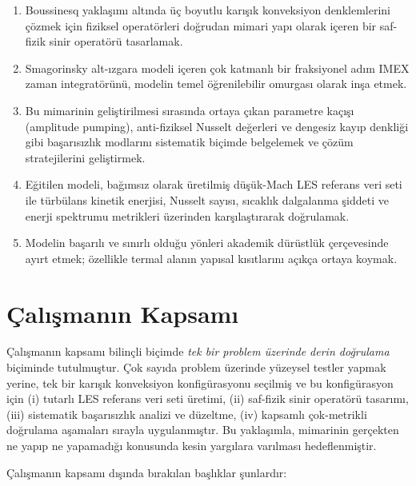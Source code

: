 \begin{enumerate}
  \item Boussinesq yaklaşımı altında üç boyutlu karışık konveksiyon denklemlerini çözmek için fiziksel operatörleri doğrudan mimari yapı olarak içeren bir saf-fizik sinir operatörü tasarlamak.
  \item Smagorinsky alt-ızgara modeli içeren çok katmanlı bir fraksiyonel adım IMEX zaman integratörünü, modelin temel öğrenilebilir omurgası olarak inşa etmek.
  \item Bu mimarinin geliştirilmesi sırasında ortaya çıkan parametre kaçışı (amplitude pumping), anti-fiziksel Nusselt değerleri ve dengesiz kayıp denkliği gibi başarısızlık modlarını sistematik biçimde belgelemek ve çözüm stratejilerini geliştirmek.
  \item Eğitilen modeli, bağımsız olarak üretilmiş düşük-Mach LES referans veri seti ile türbülans kinetik enerjisi, Nusselt sayısı, sıcaklık dalgalanma şiddeti ve enerji spektrumu metrikleri üzerinden karşılaştırarak doğrulamak.
  \item Modelin başarılı ve sınırlı olduğu yönleri akademik dürüstlük çerçevesinde ayırt etmek; özellikle termal alanın yapısal kısıtlarını açıkça ortaya koymak.
\end{enumerate}

\section{Çalışmanın Kapsamı}

Çalışmanın kapsamı bilinçli biçimde \emph{tek bir problem üzerinde derin doğrulama} biçiminde tutulmuştur. Çok sayıda problem üzerinde yüzeysel testler yapmak yerine, tek bir karışık konveksiyon konfigürasyonu seçilmiş ve bu konfigürasyon için (i) tutarlı LES referans veri seti üretimi, (ii) saf-fizik sinir operatörü tasarımı, (iii) sistematik başarısızlık analizi ve düzeltme, (iv) kapsamlı çok-metrikli doğrulama aşamaları sırayla uygulanmıştır. Bu yaklaşımla, mimarinin gerçekten ne yapıp ne yapamadığı konusunda kesin yargılara varılması hedeflenmiştir.

Çalışmanın kapsamı dışında bırakılan başlıklar şunlardır:

